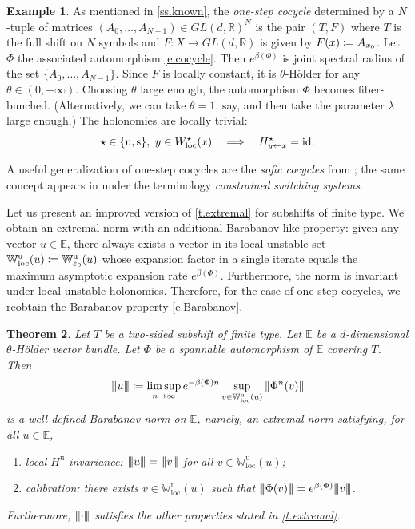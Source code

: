 \documentclass[JEP,XML,SOM,Unicode]{cedram}
\def\vcentcolon{\mathrel{\mathop\ordinarycolon}}
\providecommand\ordinarycolon{:}
\providecommand*\coloneqq{\vcentcolon\mathrel{\mkern-1.2mu}=}
\newcommand\implique{\mathchoice{\Longrightarrow}{\Rightarrow}{\Rightarrow}{\Rightarrow}}
\theoremstyle{plain}
\newtheorem{theorem}{Theorem}[section]
\theoremstyle{definition}
\newtheorem{example}[theorem]{Example}
\renewcommand{\theenumi}{\alph{enumi}}%
\newcommand{\tribar}[1]{\mathopen{| {\kern -1.5pt} | {\kern -1.5pt} |} {#1}
\mathclose{| {\kern -1.5pt} | {\kern -1.5pt} |}}
\newcommand{\RR}{\mathbb{R}}
\newcommand{\EE}{\mathbb{E}}
\newcommand{\WW}{\mathbb{W}}
\newcommand{\id}{\mathrm{id}}
\newcommand{\GL}{\mathit{GL}}
\newcommand{\uu}{\mathrm{u}}
\renewcommand{\ss}{\mathrm{s}}
\let\epsilon\varepsilon
\begin{document}
\begin{example}\label{ex.one-step}
As mentioned in \cref{ss.known},
the \emph{one-step cocycle} determined by a $N$-tuple of matrices $(A_0,\dots,A_{N-1}) \in \GL(d,\RR)^N$ is the pair $(T,F)$ where $T$ is the full shift on $N$ symbols and $F \colon X \to \GL(d,\RR)$ is given by $F(x) \coloneqq A_{x_0}$.
Let~$\Phi$ the associated automorphism \eqref{e.cocycle}.
Then $e^{\beta(\Phi)}$ is joint spectral radius of the set $\{A_0,\dots,A_{N-1}\}$.
Since $F$ is locally constant, it is $\theta$-Hölder for any $\theta \in (0,+\infty)$.
Choosing $\theta$ large enough, the automorphism $\Phi$ becomes fiber-bunched.
(Alternatively, we can take $\theta=1$, say, and then take the parameter $\lambda$ large enough.)
The holonomies are locally trivial:
\begin{equation}\label{e.trivial_holonomies}
\star \in \{\uu, \ss\}, \
y \in W^\star_\mathrm{loc}(x) \quad \implique \quad H^\star_{y \gets x} = \id.
\end{equation}

A useful generalization of one-step cocycles are the \emph{sofic cocycles} from \cite[\S 5.1]{BPS}; the same concept appears in \cite{PEDJ} under the terminology \emph{constrained switching systems}.
\end{example}

Let us present an improved version of \cref{t.extremal} for subshifts of finite type.
We obtain an extremal norm with an additional Barabanov-like property:
given any vector $u \in \EE $, there always exists a vector in its local unstable set $\WW^\uu_\mathrm{loc}(u) \coloneqq \WW^\uu_{\epsilon_0}(u)$ whose expansion factor in a single
iterate equals the maximum asymptotic expansion rate $ e^{\beta(\Phi)} $.
Furthermore, the norm is invariant under local unstable holonomies.
Therefore, for the case of one-step cocycles, we reobtain the Barabanov property \eqref{e.Barabanov}.

\begin{theorem}\label{t.Barabanov}
Let $ T $ be a two-sided subshift of finite type.
Let $ \EE $ be a $d$-dimensional $\theta$-Hölder vector bundle.
Let $ \Phi $ be a spannable automorphism of $ \EE $ covering $ T $.
Then
\begin{equation}\label{e.formula_Barabanov}
\tribar{u} \coloneqq \limsup_{n \to \infty} e^{-\beta(\Phi) n} \sup_{v \in \WW^{\uu}_{\mathrm{loc}}(u)} \| \Phi^n (v) \|
\end{equation}
is a well-defined \emph{Barabanov norm} on $ \EE $, namely, an extremal norm satisfying, for all $ u \in \EE$,
\begin{enumerate}\renewcommand{\theenumi}{\arabic{enumi}}%
\item\label{i.Barabanov_invariance}
\emph{local $H^{\uu}$-invariance:} $ \tribar{u} = \tribar{v}$ for all $ v \in \WW^{\uu}_{\mathrm{loc}}(u) $;
\item\label{i.Barabanov_calibration}
\emph{calibration:} there exists $ v \in \WW^{\uu}_{\mathrm{loc}}(u) $ such that $ \tribar{\Phi(v)} = e^{\beta(\Phi)} \tribar{v}$.
\end{enumerate}
Furthermore, $\tribar{\mathord{\cdot}}$ satisfies the other properties stated in \cref{t.extremal}.
\end{theorem}
\end{document}
